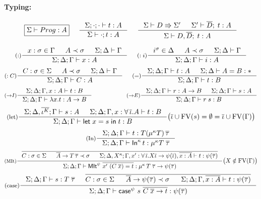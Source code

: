 \paragraph{Typing:}
\[ \fbox{$\Sigma |- Prog : A$}
 ~~~~
   \inference[]{\Sigma;\cdot;\cdot |- t:A}
               {\Sigma |- \cdot;t : A}
 ~~~~
   \inference[]{ \Sigma |- D \Rrightarrow \Sigma'
               & \Sigma' |- \overline{D};\; t : A}
               {\Sigma |- D,\overline{D};\; t : A}
\]

\[ \inference[($:$)]
      {x:\sigma \in \Gamma & A\prec\sigma & \Sigma;\Delta |- \Gamma} 
      {\Sigma;\Delta;\Gamma |- x:A}
 ~~~~
   \inference[($:i$)]
      {i^\sigma \in \Delta & A\prec\sigma & \Sigma;\Delta |- \Gamma} 
      {\Sigma;\Delta;\Gamma |- i:A}
\]
\[ \inference[($:C$)]
      {C:\sigma \in \Sigma & A\prec\sigma & \Sigma;\Delta |- \Gamma}
      {\Sigma;\Delta;\Gamma |- C:A}
 ~~~~
   \inference[($=$)]{\Sigma;\Delta;\Gamma |- t : A & \Sigma;\Delta |- A = B : *}
                    {\Sigma;\Delta;\Gamma |- t : B}
\]
\[ \inference[($->$$I$)]{\Sigma;\Delta;\Gamma,x:A |- t : B}
                        {\Sigma;\Delta;\Gamma |- \lambda x.t : A -> B}
 ~~~~ ~~~~ ~~~~ ~~~~
   \inference[($->$$E$)]{ \Sigma;\Delta;\Gamma |- r : A -> B
                        & \Sigma;\Delta;\Gamma |- s : A}
                        {\Sigma;\Delta;\Gamma |- r\;s : B}
\]
\[ \inference[(let)]
      { \Sigma;\Delta,\overline{\iota^K};\Gamma |- s : A
      & \Sigma;\Delta;\Gamma,x:\forall\,\overline{\iota}.A |- t : B }
      {\Sigma;\Delta;\Gamma |- \Let{x}{s}{t} : B }
      \big( \overline{\iota} \cup \FV(s) = \emptyset =
            \overline{\iota} \cup \FV(\Gamma) \big)
\]
\[ \inference[(In)]
      {\Sigma;\Delta;\Gamma |- t : T(\mu^\kappa T)\,\overline{\tau}}
      {\Sigma;\Delta;\Gamma |- \In^\kappa\,t : \mu^\kappa T\; \overline{\tau}}
\]
\[ \inference[(MIt)]
      { \overline{\begin{matrix}
        C:\sigma\in\Sigma ~&~ \overline{A} -> T\,\overline\tau \prec \sigma
      ~&~
        \Sigma;\Delta,X^{\kappa};
        \Gamma
            ,x':\forall\,\overline\iota.X\overline\iota -> \psi(\overline\iota)
            ,\overline{x:A}
          |- t : \psi(\overline\tau) \end{matrix} }
      }
      {\Sigma;\Delta;\Gamma
           |- \MIt^\psi ~ \overline{x' ~ (C\;\overline{x}) = t}
            : \mu^{\kappa}\,T\;\overline\tau -> \psi(\overline\tau) }
      \big( X\notin\FV(\Gamma) \big)
\]
\[ \inference[(case)]
      { \Sigma;\Delta;\Gamma |- s : T\;\overline\tau
      & \overline{\begin{matrix}
          C:\sigma \in \Sigma ~&~
          \overline{A} -> \psi(\overline{\tau}) \prec \sigma ~&~
          \Sigma;\Delta;\Gamma,\overline{x:A} |- t : \psi(\overline\tau) 
        \end{matrix} }
      }
      {\Sigma;\Delta;\Gamma |- \case^\psi~s~\overline{C\;\overline{x} -> t}
                             : \psi(\overline\tau) }
\]



